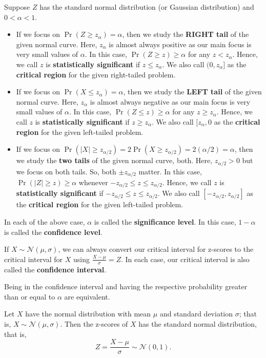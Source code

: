 \documentclass{ximera}
\begin{document}
\hspace{1cm}
\begin{definition} Suppose  $Z$ has the standard normal distribution (or Gaussian distribution) and $0<\alpha<1$.
\begin{itemize}
    \item If we focus on  $\Pr(Z\geq z_{\alpha})=\alpha$, then  we study the {\bf RIGHT tail} of the given normal curve. Here, $z_{\alpha}$ is almost always positive as our main focus is very small values of $\alpha$. In this case, $\Pr(Z\geq z)\geq\alpha$ for any $z<z_{\alpha}$. Hence, we call $z$ is {\bf statistically significant} if $z\leq z_{\alpha}$. We also call $(0,z_{\alpha}]$ as the {\bf critical region} for the given right-tailed problem. 
    \item If we focus on  $\Pr(X\leq z_{\alpha})=\alpha$, then  we study the {\bf LEFT tail} of the given normal curve. Here, $z_{\alpha}$ is almost always negative  as our main focus is very small values of $\alpha$. In this case, $\Pr(Z\leq z)\geq \alpha$ for any $z\geq z_{\alpha}$. Hence, we call $z$ is {\bf statistically significant} if $z\geq z_{\alpha}$. We also call $[z_{\alpha},0$ as the {\bf critical region} for the given left-tailed problem. 

    \item If we focus on  $\Pr(|X|\geq z_{\alpha/2})=2\Pr(X\geq z_{\alpha/2})=2(\alpha/2)=\alpha$, then  we study the {\bf two tails} of the given normal curve, both. Here, $z_{\alpha/2}>0$ but we focus on both tails. So, both $\pm z_{\alpha/2}$ matter. In this case, $\Pr(|Z|\geq z)\geq \alpha$ whenever $-z_{\alpha/2}\leq z \leq z_{\alpha/2}$. Hence, we call $z$ is {\bf statistically significant} if $-z_{\alpha/2}\leq z \leq z_{\alpha/2}$. We also call $[-z_{\alpha/2},z_{\alpha/2}]$ as the {\bf critical region} for the given left-tailed problem. 
\end{itemize}

In each of the above case, $\alpha$  is called the {\bf significance level}. In this case, $1-\alpha$ is called the {\bf confidence level}.

If $X\sim \mathcal N(\mu,\sigma)$, we can always convert our critical interval for z-scores to the critical interval for $X$ using $\frac{X-\mu}{\sigma}=Z$. In each case, our critical interval is also called the {\bf confidence interval}.
\end{definition}

\begin{remark}
Being in the confidence interval and having the respective probability greater than or equal to $\alpha$ are equivalent. 
\end{remark}
\begin{theorem}
Let $X$ have the normal distribution with mean $\mu$ and standard deviation $\sigma$; that is, $X\sim \mathcal N(\mu,\sigma)$. Then the z-scores of $X$ has the standard normal distribution, that is, $$Z=\frac{X-\mu}{\sigma}\sim \mathcal N(0,1).$$ 
\end{theorem}
\end{document}
